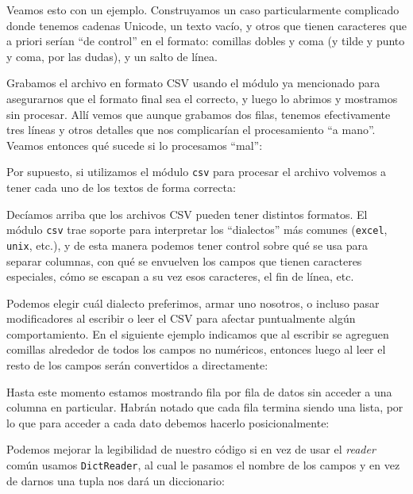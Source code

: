 Veamos esto con un ejemplo. Construyamos un caso particularmente complicado donde tenemos cadenas Unicode, un texto vacío, y otros que tienen caracteres que a priori serían ``de control'' en el formato: comillas dobles y coma (y tilde y punto y coma, por las dudas), y un salto de línea.


Grabamos el archivo en formato CSV usando el módulo ya mencionado para asegurarnos que el formato final sea el correcto, y luego lo abrimos y mostramos sin procesar. Allí vemos que aunque grabamos dos filas, tenemos efectivamente tres líneas y otros detalles que nos complicarían el procesamiento ``a mano''. Veamos entonces qué sucede si lo procesamos ``mal'':


Por supuesto, si utilizamos el módulo \texttt{csv} para procesar el archivo volvemos a tener cada uno de los textos de forma correcta:


Decíamos arriba que los archivos CSV pueden tener distintos formatos. El módulo \texttt{csv} trae soporte para interpretar los ``dialectos'' más comunes (\texttt{excel}, \texttt{unix}, etc.), y de esta manera podemos tener control sobre qué se usa para separar columnas, con qué se envuelven los campos que tienen caracteres especiales, cómo se escapan a su vez esos caracteres, el fin de línea, etc. 

Podemos elegir cuál dialecto preferimos, armar uno nosotros, o incluso pasar modificadores al escribir o leer el CSV para afectar puntualmente algún comportamiento. En el siguiente ejemplo indicamos que al escribir se agreguen comillas alrededor de todos los campos no numéricos, entonces luego al leer el resto de los campos serán convertidos a  directamente:


Hasta este momento estamos mostrando fila por fila de datos sin acceder a una columna en particular. Habrán notado que cada fila termina siendo una lista, por lo que para acceder a cada dato debemos hacerlo posicionalmente:


Podemos mejorar la legibilidad de nuestro código si en vez de usar el \textit{reader} común usamos \texttt{DictReader}, al cual le pasamos el nombre de los campos y en vez de darnos una tupla nos dará un diccionario:


